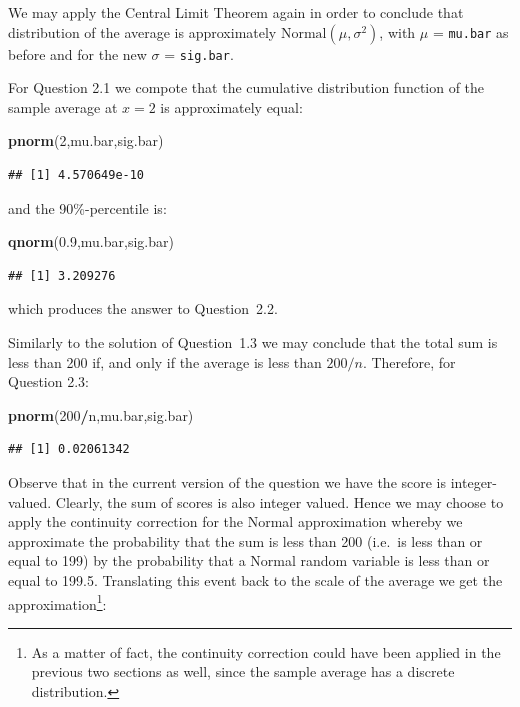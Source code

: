 \documentclass[
]{krantz}
\makeatletter
\newenvironment{Shaded}{\begin{snugshade}}{\end{snugshade}}
\newcommand{\DecValTok}[1]{\textcolor[rgb]{0.00,0.00,0.81}{#1}}
\newcommand{\FloatTok}[1]{\textcolor[rgb]{0.00,0.00,0.81}{#1}}
\newcommand{\KeywordTok}[1]{\textcolor[rgb]{0.13,0.29,0.53}{\textbf{#1}}}
\newcommand{\NormalTok}[1]{#1}
\newcommand{\OperatorTok}[1]{\textcolor[rgb]{0.81,0.36,0.00}{\textbf{#1}}}
\newenvironment{kframe}{%
\medskip{}
\setlength{\fboxsep}{.8em}
 \def\at@end@of@kframe{}%
 \ifinner\ifhmode%
  \def\at@end@of@kframe{\end{minipage}}%
  \begin{minipage}{\columnwidth}%
 \fi\fi%
 \def\FrameCommand##1{\hskip\@totalleftmargin \hskip-\fboxsep
 \colorbox{shadecolor}{##1}\hskip-\fboxsep
     \hskip-\linewidth \hskip-\@totalleftmargin \hskip\columnwidth}%
 \MakeFramed {\advance\hsize-\width
   \@totalleftmargin\z@ \linewidth\hsize
   \@setminipage}}%
 {\par\unskip\endMakeFramed%
 \at@end@of@kframe}
\renewenvironment{Shaded}{\begin{kframe}}{\end{kframe}}
\theoremstyle{definition}
\theoremstyle{definition}
\theoremstyle{definition}
\theoremstyle{remark}
\makeatother
\begin{document}
We may apply the Central Limit Theorem again in order to conclude that
distribution of the average is approximately
\(\mathrm{Normal}(\mu, \sigma^2)\), with \(\mu\) = \texttt{mu.bar} as before and
for the new \(\sigma\) = \texttt{sig.bar}.

For Question 2.1 we compote that the cumulative distribution function of
the sample average at \(x=2\) is approximately equal:

\begin{Shaded}
\begin{Highlighting}[]
\KeywordTok{pnorm}\NormalTok{(}\DecValTok{2}\NormalTok{,mu.bar,sig.bar)}
\end{Highlighting}
\end{Shaded}

\begin{verbatim}
## [1] 4.570649e-10
\end{verbatim}

and the 90\%-percentile is:

\begin{Shaded}
\begin{Highlighting}[]
\KeywordTok{qnorm}\NormalTok{(}\FloatTok{0.9}\NormalTok{,mu.bar,sig.bar)}
\end{Highlighting}
\end{Shaded}

\begin{verbatim}
## [1] 3.209276
\end{verbatim}

which produces the answer to Question~2.2.

Similarly to the solution of Question~1.3 we may conclude that the total
sum is less than 200 if, and only if the average is less than \(200/n\).
Therefore, for Question 2.3:

\begin{Shaded}
\begin{Highlighting}[]
\KeywordTok{pnorm}\NormalTok{(}\DecValTok{200}\OperatorTok{/}\NormalTok{n,mu.bar,sig.bar)}
\end{Highlighting}
\end{Shaded}

\begin{verbatim}
## [1] 0.02061342
\end{verbatim}

Observe that in the current version of the question we have the score is
integer-valued. Clearly, the sum of scores is also integer valued. Hence
we may choose to apply the continuity correction for the Normal
approximation whereby we approximate the probability that the sum is
less than 200 (i.e.~is less than or equal to 199) by the probability
that a Normal random variable is less than or equal to 199.5.
Translating this event back to the scale of the average we get the
approximation\footnote{As a matter of fact, the continuity correction could have been
  applied in the previous two sections as well, since the sample
  average has a discrete distribution.}:
\end{document}
